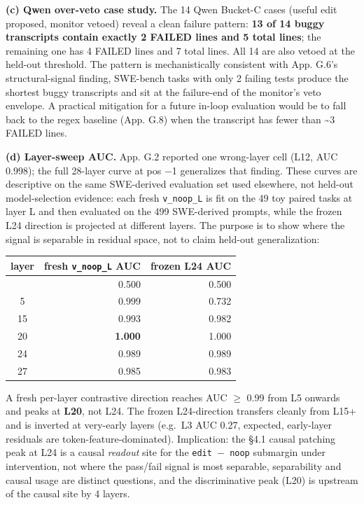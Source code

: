 \documentclass[
  11pt,
  a4paper]{article}
\newcounter{none} %
\begin{document}
\textbf{(c) Qwen over-veto case study.} The 14 Qwen Bucket-C cases
(useful edit proposed, monitor vetoed) reveal a clean failure pattern:
\textbf{13 of 14 buggy transcripts contain exactly 2 FAILED lines and 5
total lines}; the remaining one has 4 FAILED lines and 7 total lines.
All 14 are also vetoed at the held-out threshold. The pattern is
mechanistically consistent with App. G.6's structural-signal finding,
SWE-bench tasks with only 2 failing tests produce the shortest buggy
transcripts and sit at the failure-end of the monitor's veto envelope. A
practical mitigation for a future in-loop evaluation would be to fall
back to the regex baseline (App. G.8) when the transcript has fewer than
\textasciitilde3 FAILED lines.

\textbf{(d) Layer-sweep AUC.} App. G.2 reported one wrong-layer cell
(L12, AUC 0.998); the full 28-layer curve at pos \ensuremath{-}1 generalizes that
finding. These curves are descriptive on the same SWE-derived evaluation
set used elsewhere, not held-out model-selection evidence: each fresh
\texttt{v\_noop\_L} is fit on the 49 toy paired tasks at layer L and
then evaluated on the 499 SWE-derived prompts, while the frozen L24
direction is projected at different layers. The purpose is to show where
the signal is separable in residual space, not to claim held-out
generalization:

{\def\LTcaptype{none} %
\begin{longtable}[]{@{}crr@{}}
\toprule\noalign{}
layer & fresh \texttt{v\_noop\_L} AUC & frozen L24 AUC \\
\midrule\noalign{}
\endhead
\bottomrule\noalign{}
\endlastfoot
0 & 0.500 & 0.500 \\
5 & 0.999 & 0.732 \\
15 & 0.993 & 0.982 \\
20 & \textbf{1.000} & 1.000 \\
24 & 0.989 & 0.989 \\
27 & 0.985 & 0.983 \\
\end{longtable}
}

A fresh per-layer contrastive direction reaches AUC \ensuremath{\geq} 0.99 from L5
onwards and peaks at \textbf{L20}, not L24. The frozen L24-direction
transfers cleanly from L15+ and is inverted at very-early layers
(e.g.~L3 AUC 0.27, expected, early-layer residuals are
token-feature-dominated). Implication: the \S{}4.1 causal patching peak at
L24 is a causal \emph{readout} site for the \texttt{edit\ \ensuremath{-}\ noop}
submargin under intervention, not where the pass/fail signal is most
separable, separability and causal usage are distinct questions, and the
discriminative peak (L20) is upstream of the causal site by 4 layers.
\end{document}
